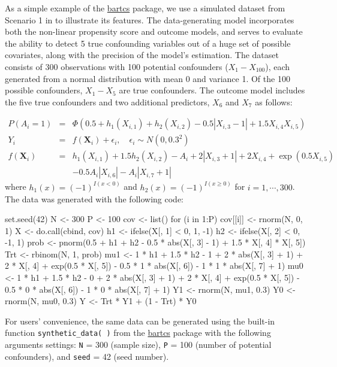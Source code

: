 As a simple example of the \href{https://CRAN.R-project.org/package=bartcs}{bartcs} package, we use a simulated dataset from Scenario 1 in \cite{kim2023bnp} to illustrate its features. The data-generating model incorporates both the non-linear propensity score and outcome models, and serves to evaluate the ability to detect 5 true confounding variables out of a huge set of possible covariates, along with the precision of the model's estimation. The dataset consists of 300 observations with 100 potential confounders ($X_1 - X_{100}$), each generated from a normal distribution with mean 0 and variance 1. Of the 100 possible confounders, $X_1 - X_5$ are true confounders. The outcome model includes the five true confounders and two additional predictors, $X_6$ and $X_7$ as follows:


\begin{eqnarray*}
P(A_i=1) &=& \Phi(0.5+h_1(X_{i,1}) + h_2(X_{i,2}) - 0.5 |X_{i,3}-1| +1.5 X_{i,4} X_{i,5})\\
Y_i & = & f(\boldsymbol{X}_i) + \epsilon_i, \quad \epsilon_i \sim N(0, 0.3^2) \\
f(\boldsymbol{X}_i) & = & h_1(X_{i,1}) + 1. 5 h_2(X_{i,2}) - A_i + 2 |X_{i,3}+1| + 2 X_{i,4} + \exp(0.5 X_{i,5}) \\
& & - 0.5 A_i |X_{i,6}| - A_i |X_{i,7}+1|
\end{eqnarray*}
%
where $h_1(x) = (-1)^{I(x<0)}$ and $h_2(x) = (-1)^{I(x\geq0)}$ for $i=1, \cdots, 300$.
The data was generated with the following code:

\begin{example}
set.seed(42)
N <- 300
P <- 100
cov <- list()
for (i in 1:P) {
     cov[[i]] <- rnorm(N, 0, 1)
   }
X <- do.call(cbind, cov)
h1 <- ifelse(X[, 1] < 0, 1, -1)
h2 <- ifelse(X[, 2] < 0, -1, 1)
prob <- pnorm(0.5 + h1 + h2 - 0.5 * abs(X[, 3] - 1) + 1.5 * X[, 4] * X[, 5])
Trt <- rbinom(N, 1, prob)
mu1 <- 1 * h1 + 1.5 * h2 - 1 + 2 * abs(X[, 3] + 1) + 2 * X[, 4] + exp(0.5 * X[, 5]) -
     0.5 * 1 * abs(X[, 6]) - 1 * 1 * abs(X[, 7] + 1)
mu0 <- 1 * h1 + 1.5 * h2 - 0 + 2 * abs(X[, 3] + 1) + 2 * X[, 4] + exp(0.5 * X[, 5]) -
     0.5 * 0 * abs(X[, 6]) - 1 * 0 * abs(X[, 7] + 1)
Y1 <- rnorm(N, mu1, 0.3)
Y0 <- rnorm(N, mu0, 0.3)
Y <- Trt * Y1 + (1 - Trt) * Y0
\end{example}
For users' convenience, the same data can be generated using the built-in function \verb|synthetic_data( )| from the \href{https://CRAN.R-project.org/package=bartcs}{bartcs} package with the  following arguments settings: \verb|N| = 300 (sample size), \verb|P| = 100 (number of potential confounders), and \verb|seed| = 42 (seed number).

